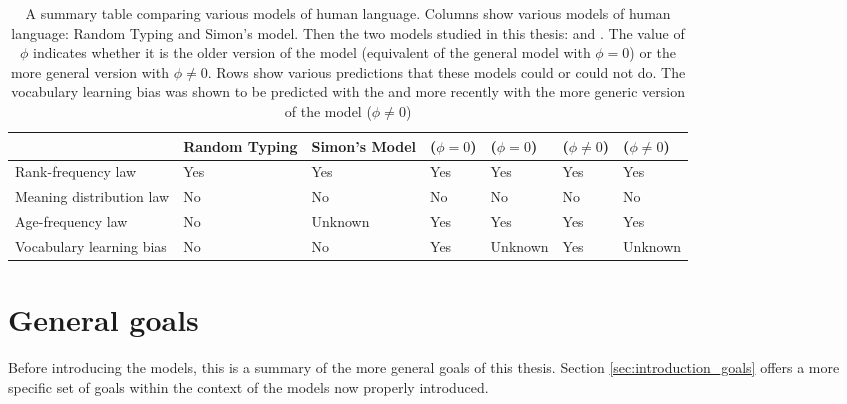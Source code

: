\begin{table}
  \centering
  \begin{tabular}{p{2.5cm}p{1.5cm}p{1.5cm}p{1.5cm}p{1.5cm}p{1.5cm}p{1.5cm}}
    \toprule
                             & Random Typing & Simon's Model        & \Firstmodel{} ($\phi=0$) & \Secondmodel{} ($\phi=0$) & \Firstmodel{} ($\phi\neq 0$) & \Secondmodel{} ($\phi\neq 0$) \\
    \midrule
    Rank-frequency law       &      Yes      &      Yes             &             Yes          &           Yes             &           Yes            &           Yes             \\
    \addlinespace
    Meaning distribution law &      No       &      No              &             No           &           No              &           No             &           No              \\
    \addlinespace
    Age-frequency law        &      No       &    Unknown           &             Yes          &           Yes             &           Yes            &           Yes             \\
    \addlinespace
    Vocabulary learning bias &      No       &      No              &  Yes \cite{Ferrer2017a}  &         Unknown           &  Yes \cite{Carrera2021a} &         Unknown           \\
    \bottomrule
  \end{tabular}
  \caption{
    A summary table comparing various models of human language.
    Columns show various models of human language: Random Typing and Simon's model.
    Then the two models studied in this thesis: \firstm{} and \secondmodel{}.
    The value of $\phi$ indicates whether it is the older version of the model (equivalent of the general model with $\phi=0$) or the more general version with $\phi \neq 0$.
    Rows show various predictions that these models could or could not do.
    The vocabulary learning bias was shown to be predicted with the \firstmodel{} and more recently with the more generic version of the model ($\phi \neq 0$)
  }
  \label{tab:comparison_models}
\end{table}

\section{General goals}
\label{sec:introduction_general-goals}

Before introducing the models, this is a summary of the more general goals of this thesis.
Section \ref{sec:introduction_goals} offers a more specific set of goals within the context of the models now properly introduced.

